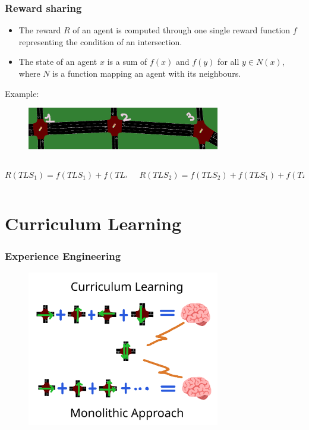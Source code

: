 \documentclass[dvipsnames]{beamer}
\begin{document}
\begin{frame}
\frametitle{Reward sharing}

  \begin{itemize}
    \item The reward $R$ of an agent is computed through one single reward function $f$ representing the condition of an intersection. \\
    \item The state of an agent $x$ is a sum of $f(x)$ and $f(y)$ for all $y \in N(x)$, where $N$ is a function mapping an agent with its neighbours. \\
  \end{itemize}

  Example:
  \begin{figure}
    \centering
    \includegraphics[width=0.75\textwidth]{figures/sumo-rf-tls-triplet.png}
  \end{figure}

  
  \begin{columns}
    \begin{column}{0.4\textwidth}
      \centering
      {\footnotesize$R({TLS}_{1}) = f({TLS}_{1}) + f({TLS}_{2})$}
    \end{column}
    \begin{column}{0.6\textwidth}
      \centering
      {\footnotesize$R({TLS}_{2}) = f({TLS}_{2}) + f({TLS}_{1}) + f({TLS}_{3})$}
    \end{column}
  \end{columns}
\end{frame}

\section{Curriculum Learning}

\begin{frame}
\frametitle{Experience Engineering}
  \begin{figure}
    \centering
    \includegraphics[width=0.75\textwidth]{figures/curriculum-vs-monolithic.png}
  \end{figure}
\end{frame}
\end{document}
